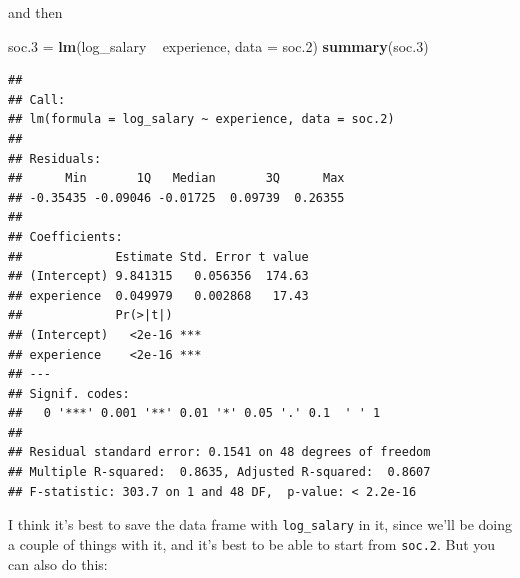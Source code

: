 \documentclass[]{tufte-book}
\newenvironment{Shaded}{}{}
\newcommand{\DataTypeTok}[1]{\textcolor[rgb]{0.56,0.13,0.00}{#1}}
\newcommand{\FloatTok}[1]{\textcolor[rgb]{0.25,0.63,0.44}{#1}}
\newcommand{\KeywordTok}[1]{\textcolor[rgb]{0.00,0.44,0.13}{\textbf{#1}}}
\newcommand{\NormalTok}[1]{#1}
\newcommand{\OperatorTok}[1]{\textcolor[rgb]{0.40,0.40,0.40}{#1}}
\newcommand{\StringTok}[1]{\textcolor[rgb]{0.25,0.44,0.63}{#1}}
\theoremstyle{definition}
\theoremstyle{definition}
\theoremstyle{definition}
\theoremstyle{remark}
\begin{document}
\begin{Shaded}
\end{Shaded}

and then

\begin{Shaded}
\begin{Highlighting}[]
\NormalTok{soc}\FloatTok{.3}\NormalTok{ =}\StringTok{ }\KeywordTok{lm}\NormalTok{(log_salary }\OperatorTok{~}\StringTok{ }\NormalTok{experience, }\DataTypeTok{data =}\NormalTok{ soc}\FloatTok{.2}\NormalTok{)}
\KeywordTok{summary}\NormalTok{(soc}\FloatTok{.3}\NormalTok{)}
\end{Highlighting}
\end{Shaded}

\begin{verbatim}
## 
## Call:
## lm(formula = log_salary ~ experience, data = soc.2)
## 
## Residuals:
##      Min       1Q   Median       3Q      Max 
## -0.35435 -0.09046 -0.01725  0.09739  0.26355 
## 
## Coefficients:
##             Estimate Std. Error t value
## (Intercept) 9.841315   0.056356  174.63
## experience  0.049979   0.002868   17.43
##             Pr(>|t|)    
## (Intercept)   <2e-16 ***
## experience    <2e-16 ***
## ---
## Signif. codes:  
##   0 '***' 0.001 '**' 0.01 '*' 0.05 '.' 0.1  ' ' 1
## 
## Residual standard error: 0.1541 on 48 degrees of freedom
## Multiple R-squared:  0.8635, Adjusted R-squared:  0.8607 
## F-statistic: 303.7 on 1 and 48 DF,  p-value: < 2.2e-16
\end{verbatim}

I think it's best to save the data frame with \texttt{log\_salary} in
it, since we'll be doing a couple of things with it, and it's best to be
able to start from \texttt{soc.2}. But you can also do this:

\begin{Shaded}
\end{Shaded}
\end{document}
